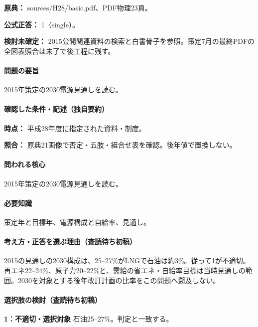 \noindent\textbf{原典：} sources/H28/basic.pdf、PDF物理23頁。

\textbf{公式正答：} 1（single）。

\par\textbf{検討未確定：} 2015公開関連資料の検索と白書骨子を参照。策定7月の最終PDFの全図表照合は未了で後工程に残す。

\paragraph{問題の要旨} 2015年策定の2030電源見通しを読む。

\paragraph{確認した条件・記述（独自要約）}\mbox{}\par

\noindent\textbf{時点：} 平成28年度に指定された資料・制度。\par

\noindent\textbf{照合：} 原典21画像で否定・五肢・組合せ表を確認。後年値で置換しない。\par

\paragraph{問われる核心} 2015年策定の2030電源見通しを読む。

\paragraph{必要知識} 策定年と目標年、電源構成と自給率、見通し。

\paragraph{考え方・正答を選ぶ理由（査読待ち初稿）} 2015の見通しの2030構成は、25–27\%がLNGで石油は約3\%。従って1が不適切。再エネ22–24\%、原子力20–22\%と、需給の省エネ・自給率目標は当時見通しの範囲。2030を対象とする後年改訂計画の比率をこの問題へ遡及しない。

\paragraph{選択肢の検討（査読待ち初稿）}\mbox{}\par

\noindent\textbf{1：不適切・選択対象} 石油25–27\%。判定と一致する。\par

